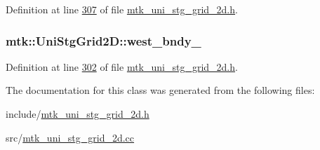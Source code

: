 Definition at line \hyperlink{mtk__uni__stg__grid__2d_8h_source_l00307}{307} of file \hyperlink{mtk__uni__stg__grid__2d_8h_source}{mtk\+\_\+uni\+\_\+stg\+\_\+grid\+\_\+2d.\+h}.

\hypertarget{classmtk_1_1UniStgGrid2D_a59c42d8099a017bc8a082fddc1e5606c}{
\subsubsection[{west\+\_\+bndy\+\_\+}]{ mtk\+::\+Uni\+Stg\+Grid2\+D\+::west\+\_\+bndy\+\_\+\hspace{0.3cm}{\ttfamily [private]}}}\label{classmtk_1_1UniStgGrid2D_a59c42d8099a017bc8a082fddc1e5606c}


Definition at line \hyperlink{mtk__uni__stg__grid__2d_8h_source_l00302}{302} of file \hyperlink{mtk__uni__stg__grid__2d_8h_source}{mtk\+\_\+uni\+\_\+stg\+\_\+grid\+\_\+2d.\+h}.



The documentation for this class was generated from the following files\+:\begin{DoxyCompactItemize}
\item 
include/\hyperlink{mtk__uni__stg__grid__2d_8h}{mtk\+\_\+uni\+\_\+stg\+\_\+grid\+\_\+2d.\+h}\item 
src/\hyperlink{mtk__uni__stg__grid__2d_8cc}{mtk\+\_\+uni\+\_\+stg\+\_\+grid\+\_\+2d.\+cc}\end{DoxyCompactItemize}
